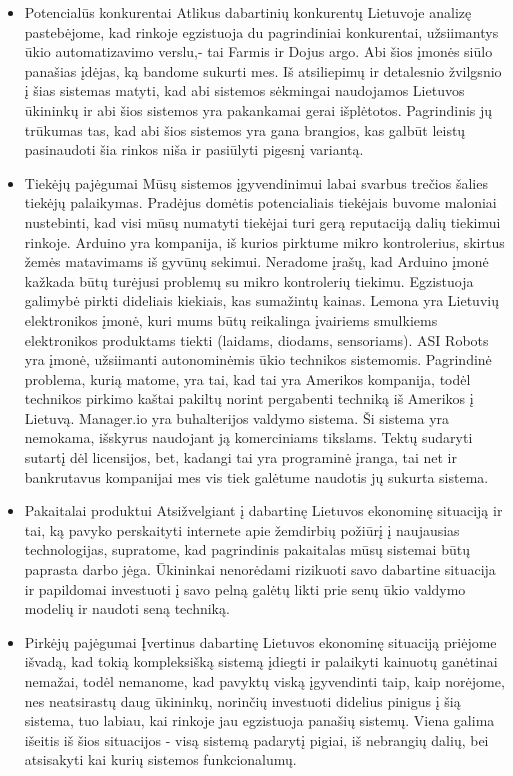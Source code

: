 \documentclass[oneside]{VUMIFPSkursinis}
\begin{document}
	\begin{itemize}
		\item{Potencialūs konkurentai}
Atlikus dabartinių konkurentų Lietuvoje analizę pastebėjome, kad rinkoje egzistuoja du pagrindiniai konkurentai, užsiimantys ūkio automatizavimo verslu,- tai Farmis ir Dojus argo. Abi šios įmonės siūlo panašias įdėjas, ką bandome sukurti mes. Iš atsiliepimų ir detalesnio žvilgsnio į šias sistemas matyti, kad abi sistemos sėkmingai naudojamos Lietuvos ūkininkų ir abi šios sistemos yra pakankamai gerai išplėtotos. Pagrindinis jų trūkumas tas, kad abi šios sistemos yra gana brangios, kas galbūt leistų pasinaudoti šia rinkos niša ir pasiūlyti pigesnį variantą.
		\item{Tiekėjų pajėgumai}
Mūsų sistemos įgyvendinimui labai svarbus trečios šalies tiekėjų palaikymas. Pradėjus domėtis potencialiais tiekėjais buvome maloniai nustebinti, kad visi mūsų numatyti tiekėjai turi gerą reputaciją dalių tiekimui rinkoje. Arduino yra kompanija, iš kurios pirktume mikro kontrolerius, skirtus žemės matavimams iš gyvūnų sekimui. Neradome įrašų, kad Arduino įmonė kažkada būtų turėjusi problemų su mikro kontrolerių tiekimu. Egzistuoja galimybė pirkti dideliais kiekiais, kas sumažintų kainas. Lemona yra Lietuvių elektronikos įmonė, kuri mums būtų reikalinga įvairiems smulkiems elektronikos produktams tiekti (laidams, diodams, sensoriams). ASI Robots yra įmonė, užsiimanti autonominėmis ūkio technikos sistemomis. Pagrindinė problema, kurią matome, yra tai, kad tai yra Amerikos kompanija, todėl technikos pirkimo kaštai pakiltų norint pergabenti techniką iš Amerikos į Lietuvą. Manager.io yra buhalterijos valdymo sistema. Ši sistema yra nemokama, išskyrus naudojant ją komerciniams tikslams. Tektų sudaryti sutartį dėl licensijos, bet, kadangi tai yra programinė įranga, tai net ir bankrutavus kompanijai mes vis tiek galėtume naudotis jų sukurta sistema.
		\item{Pakaitalai produktui}
Atsižvelgiant į dabartinę Lietuvos ekonominę situaciją ir tai, ką pavyko perskaityti internete apie žemdirbių požiūrį į naujausias technologijas, supratome, kad pagrindinis pakaitalas mūsų sistemai būtų paprasta darbo jėga. Ūkininkai nenorėdami rizikuoti savo dabartine situacija ir papildomai investuoti į savo pelną galėtų likti prie senų ūkio valdymo modelių ir naudoti seną techniką.
		\item{Pirkėjų pajėgumai}
Įvertinus dabartinę Lietuvos ekonominę situaciją priėjome išvadą, kad tokią kompleksišką sistemą įdiegti ir palaikyti kainuotų ganėtinai nemažai, todėl nemanome, kad pavyktų viską įgyvendinti taip, kaip norėjome, nes neatsirastų daug ūkininkų, norinčių investuoti didelius pinigus į šią sistema, tuo labiau, kai rinkoje jau egzistuoja panašių sistemų. Viena galima išeitis iš šios situacijos - visą sistemą padarytį pigiai, iš nebrangių dalių, bei atsisakyti kai kurių sistemos funkcionalumų.

\end{itemize}
\end{document}

